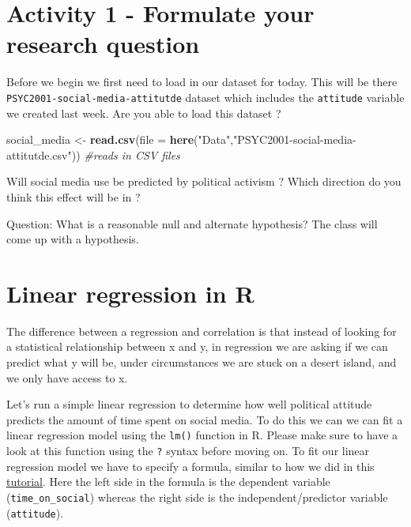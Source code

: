 \documentclass[
]{book}
\newenvironment{Shaded}{\begin{snugshade}}{\end{snugshade}}
\newcommand{\AttributeTok}[1]{\textcolor[rgb]{0.13,0.29,0.53}{#1}}
\newcommand{\CommentTok}[1]{\textcolor[rgb]{0.56,0.35,0.01}{\textit{#1}}}
\newcommand{\FunctionTok}[1]{\textcolor[rgb]{0.13,0.29,0.53}{\textbf{#1}}}
\newcommand{\NormalTok}[1]{#1}
\newcommand{\OtherTok}[1]{\textcolor[rgb]{0.56,0.35,0.01}{#1}}
\newcommand{\StringTok}[1]{\textcolor[rgb]{0.31,0.60,0.02}{#1}}
\begin{document}
\section{Activity 1 - Formulate your research question}\label{activity-1---formulate-your-research-question-2}

Before we begin we first need to load in our dataset for today. This will be there \texttt{PSYC2001-social-media-attitutde} dataset which includes the \texttt{attitude} variable we created last week. Are you able to load this dataset ?

\begin{Shaded}
\begin{Highlighting}[]
\NormalTok{social\_media }\OtherTok{\textless{}{-}} \FunctionTok{read.csv}\NormalTok{(}\AttributeTok{file =} \FunctionTok{here}\NormalTok{(}\StringTok{"Data"}\NormalTok{,}\StringTok{"PSYC2001{-}social{-}media{-}attitutde.csv"}\NormalTok{)) }\CommentTok{\#reads in CSV files}
\end{Highlighting}
\end{Shaded}

Will social media use be predicted by political activism ? Which direction do you think this effect will be in ?

Question: What is a reasonable null and alternate hypothesis? The class will come up with a hypothesis.

\section{Linear regression in R}\label{linear-regression-in-r-1}

The difference between a regression and correlation is that instead of looking for a statistical relationship between x and y, in regression we are asking if we can predict what y will be, under circumstances we are stuck on a desert island, and we only have access to x.

Let's run a simple linear regression to determine how well political attitude predicts the amount of time spent on social media. To do this we can we can fit a linear regression model using the \texttt{lm()} function in R. Please make sure to have a look at this function using the \texttt{?} syntax before moving on. To fit our linear regression model we have to specify a formula, similar to how we did in this \hyperref[independent-samples-t-test]{tutorial}. Here the left side in the formula is the dependent variable (\texttt{time\_on\_social}) whereas the right side is the independent/predictor variable (\texttt{attitude}).
\end{document}
